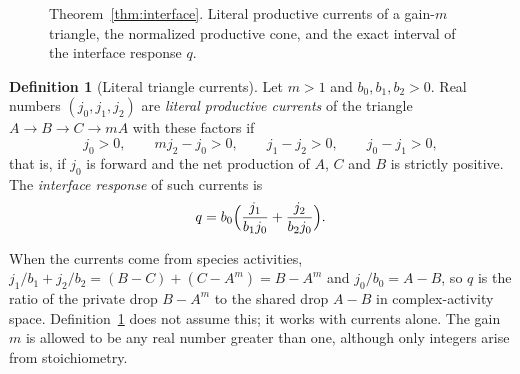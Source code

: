 \documentclass[11pt,a4paper]{article}
\theoremstyle{plain}
\theoremstyle{definition}
\newtheorem{definition}[theorem]{Definition}
\theoremstyle{remark}
\begin{document}
\begin{figure}[t]
\centering
{}
\caption{Theorem~\ref{thm:interface}. Literal productive currents of a gain-$m$ triangle, the normalized productive cone, and the exact interval of the interface response $q$.}
\label{fig:interface}
\end{figure}

\begin{definition}[Literal triangle currents]\label{def:literal}
Let $m>1$ and $b_0,b_1,b_2>0$. Real numbers $(j_0,j_1,j_2)$ are \emph{literal productive currents} of the triangle $A\to B\to C\to mA$ with these factors if
\begin{equation}\label{eq:productive}
  j_0>0,\qquad mj_2-j_0>0,\qquad j_1-j_2>0,\qquad j_0-j_1>0 ,
\end{equation}
that is, if $j_0$ is forward and the net production of $A$, $C$ and $B$ is strictly positive. The \emph{interface response} of such currents is
\begin{equation}\label{eq:response}
  q=b_0\Bigl(\frac{j_1}{b_1j_0}+\frac{j_2}{b_2j_0}\Bigr).
\end{equation}
\end{definition}

When the currents come from species activities, $j_1/b_1+j_2/b_2=(B-C)+(C-A^m)=B-A^m$ and $j_0/b_0=A-B$, so $q$ is the ratio of the private drop $B-A^m$ to the shared drop $A-B$ in complex-activity space. Definition~\ref{def:literal} does not assume this; it works with currents alone. The gain $m$ is allowed to be any real number greater than one, although only integers arise from stoichiometry.
\end{document}
